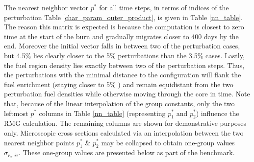 The nearest neighbor vector $p^*$ for all time steps, in terms of indices
of the perturbation Table \ref{char_param_outer_product}, is given in Table \ref{nn_table}.
The reason this matrix is expected is because the computation is closest to zero time at the start of the 
burn and gradually migrates closer to 400 days by the end.
Moreover the initial  vector falls in between two of the perturbation cases, but 4.5\% lies
clearly closer to the 5\% perturbations than the 3.5\% cases.
Lastly, the fuel region density lies exactly between two of the perturbation steps.  Thus, the 
perturbations with the minimal distance to the configuration will flank the fuel enrichment 
(staying closer to 5\% ) and remain equidistant from the two perturbation fuel 
densities while otherwise moving through the core in time.  Note that, because of the linear 
interpolation of the group constants, only the two leftmost $p^*$ columns in Table \ref{nn_table}
(representing $p_1^*$ and $p_2^*$) 
influence the RMG calculation.  The remaining columns are shown for demonstrative purposes only.
Microscopic cross sections calculated via an interpolation between the two nearest neighbor points 
$p_1^*$ \& $p_2^*$  may be collapsed to obtain one-group values  $\sigma_{r_x,i\tau}$.  These 
one-group values are presented below as part of the benchmark.



